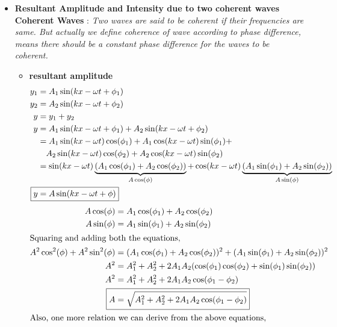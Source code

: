 \begin{itemize}
    \item \textbf{Resultant Amplitude and Intensity due to two coherent waves}\\
    \textbf{Coherent Waves }: \textit{Two waves are said to be coherent if their frequencies are same. But actually we define coherence of wave according to phase difference, means there should be a constant phase difference for the waves to be coherent.}

    \begin{itemize}
        \item \textbf{resultant amplitude}
        \begin{align*}
            y_1 &= A_1 \sin(kx-\omega t + \phi_1)\\
            y_2 &= A_2 \sin(kx-\omega t + \phi_2)\\
            y &= y_1 + y_2\\
            y &= A_1 \sin(kx-\omega t + \phi_1) + A_2 \sin(kx-\omega t + \phi_2)\\
                &= A_1 \sin(kx-\omega t) \cos(\phi_1) + A_1 \cos(kx-\omega t) \sin(\phi_1) + \\ &\quad A_2 \sin(kx-\omega t) \cos(\phi_2) + A_2 \cos(kx-\omega t) \sin(\phi_2)\\
                &= \sin(kx-\omega t) \underbrace{(A_1 \cos(\phi_1) + A_2 \cos(\phi_2))}_{A\cos(\phi)} + \cos(kx-\omega t) \underbrace{(A_1 \sin(\phi_1) + A_2 \sin(\phi_2))}_{A\sin(\phi)}\\
              \Aboxed{y  &= A \sin(kx-\omega t + \phi)}\\
        \end{align*}
        \begin{align*}
            A\cos(\phi) &= A_1 \cos(\phi_1) + A_2 \cos(\phi_2)\\
            A\sin(\phi) &= A_1 \sin(\phi_1) + A_2 \sin(\phi_2)\\
            \intertext{Squaring and adding both the equations,}
            A^2\cos^2(\phi) + A^2\sin^2(\phi) &= (A_1 \cos(\phi_1) + A_2 \cos(\phi_2))^2 + (A_1 \sin(\phi_1) + A_2 \sin(\phi_2))^2\\
            A^2 &= A_1^2 + A_2^2 + 2A_1A_2(\cos(\phi_1)\cos(\phi_2) + \sin(\phi_1)\sin(\phi_2))\\
            A^2 &= A_1^2 + A_2^2 + 2A_1A_2\cos(\phi_1 - \phi_2)\\
            \Aboxed{A &= \sqrt{A_1^2 + A_2^2 + 2A_1A_2\cos(\phi_1 - \phi_2)}}\\
            \intertext{Also, one more relation we can derive from the above equations,}

\end{align*}
\end{itemize}
\end{itemize}
